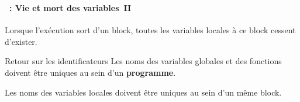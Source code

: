 \begin{frame}
  \frametitle{\secname}
  \framesubtitle{\subsecname~: Vie et mort des variables~II}
  
  Lorsque l'exécution sort d'un block, toutes les variables locales à ce block cessent d'exister.
  \vspace{0.5cm}
  \par
  \begin{alertblock}{Retour sur les identificateurs}
    Les noms des variables globales et des fonctions doivent être uniques au sein d'un \textbf{programme}.
    \par
    Les noms des variables locales doivent être uniques au sein d'un même block.    
  \end{alertblock}
\end{frame}

